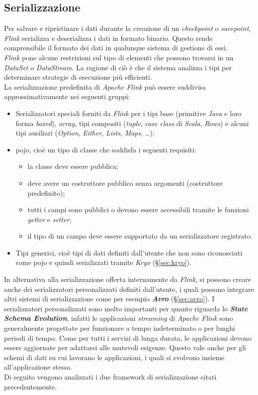 \subsection{Serializzazione}
Per salvare e ripristinare i dati durante la creazione di un \textit{checkpoint} o \textit{savepoint}, \textit{Flink} serializza e deserializza i dati in formato binario. Questo rende comprensibile il formato dei dati in qualunque sistema di gestione di essi.\\
\textit{Flink} pone alcune restrizioni sul tipo di elementi che possono trovarsi in un \textit{DataSet} o \textit{DataStream}. La ragione di ciò è che il sistema analizza i tipi per determinare strategie di esecuzione più efficienti.\\
La \gls{serializzazione} predefinita di \textit{Apache Flink} può essere suddivisa approssimativamente nei seguenti gruppi:

\begin{itemize}
	\item{
Serializzatori speciali forniti da \textit{Flink} per i tipi base (primitive \textit{Java} e loro forma \textit{boxed}), \textit{array}, tipi compositi (\textit{tuple}, \textit{case class} di \textit{Scala}, \textit{Rows}) e alcuni tipi ausiliari (\textit{Option}, \textit{Either}, \textit{Lists}, \textit{Maps}, …);}
	\item{\gls{pojo}, cioè un tipo di classe che soddisfa i seguenti requisiti:
\begin{itemize}
	\item{la classe deve essere pubblica;}
	\item{deve avere un costruttore pubblico senza argomenti (costruttore predefinito);}
	\item{tutti i campi sono pubblici o devono essere accessibili tramite le funzioni \textit{getter} e \textit{setter};}
	\item{il tipo di un campo deve essere supportato da un serializzatore registrato.}
\end{itemize}}
	\item{Tipi generici, cioè tipi di dati definiti dall'utente che non sono riconosciuti come \gls{pojo} e quindi serializzati tramite \textit{Kryo} (\S\ref{sec:kryo}).}
\end{itemize}
In alternativa alla \gls{serializzazione} offerta internamente da \textit{Flink}, si possono creare anche dei serializzatori personalizzati definiti dall'utente, i quali possono integrare altri sistemi di \gls{serializzazione} come per esempio \textbf{\textit{Avro}} (\S\ref{sec:avro}). I serializzatori personalizzati sono molto importanti per quanto riguarda lo \textbf{\textit{State Schema Evolution}}, infatti le applicazioni \textit{streaming} di \textit{Apache Flink} sono generalmente progettate per funzionare a tempo indeterminato o per lunghi periodi di tempo. Come per tutti i servizi di lunga durata, le applicazioni devono essere aggiornate per adattarsi alle mutevoli esigenze. Questo vale anche per gli schemi di dati su cui lavorano le applicazioni, i quali si evolvono insieme all'applicazione stessa.\\
Di seguito vengono analizzati i due \gls{framework} di \gls{serializzazione} citati precedentemente.

